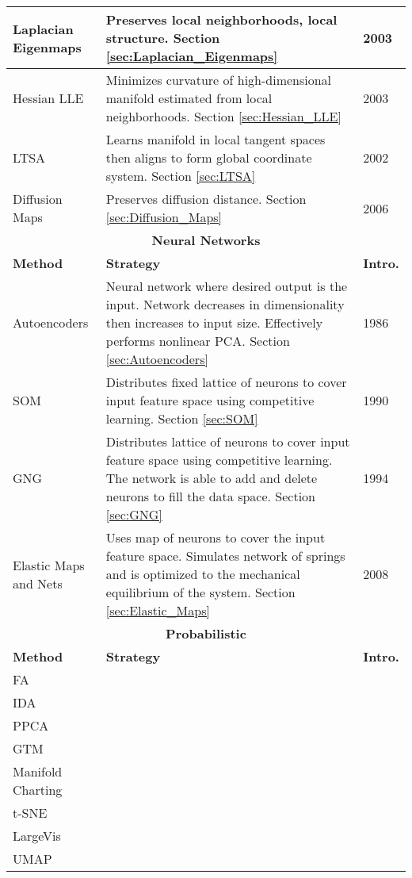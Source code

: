 \begin{longtable}{ |p{}|p{}|p{}| }
	\hline
	Laplacian Eigenmaps  & Preserves local neighborhoods, local structure.  Section \ref{sec:Laplacian_Eigenmaps}  & 2003 \\
	\hline
	Hessian LLE  & Minimizes curvature of high-dimensional manifold estimated from local neighborhoods. Section \ref{sec:Hessian_LLE} & 2003 \\
	\hline
	LTSA  &  Learns manifold in local tangent spaces then aligns to form global coordinate system.  Section \ref{sec:LTSA} & 2002\\
	\hline
	Diffusion Maps  & Preserves diffusion distance.  Section \ref{sec:Diffusion_Maps}  & 2006\\
	\hline
	\multicolumn{3}{|c|}{\textbf{Neural Networks}} \\
	\hline
	\textbf{Method} & \textbf{Strategy} & \textbf{Intro.}\\
	\hline
	Autoencoders  & Neural network where desired output is the input.  Network decreases in dimensionality then increases to input size.  Effectively performs nonlinear PCA. Section \ref{sec:Autoencoders}  & 1986 \\
	\hline
	SOM  & Distributes fixed lattice of neurons to cover input feature space using competitive learning. Section \ref{sec:SOM}   & 1990\\
	\hline
	GNG  & Distributes lattice of neurons to cover input feature space using competitive learning. The network is able to add and delete neurons to fill the data space. Section \ref{sec:GNG}& 1994\\
	\hline
	Elastic Maps and Nets  &  Uses map of neurons to cover the input feature space. Simulates network of springs and is optimized to the mechanical equilibrium of the system.  Section \ref{sec:Elastic_Maps}  & 2008 \\
	\hline
	\multicolumn{3}{|c|}{\textbf{Probabilistic}}\\
	\hline
	\textbf{Method} & \textbf{Strategy} & \textbf{Intro.}\\
	\hline
	FA  & ~   & ~\\
	\hline
	IDA  & ~  & ~\\
	\hline
	PPCA  & ~   & ~\\
	\hline
	GTM  & ~  & ~\\
	\hline
	Manifold Charting  & ~  & ~ \\
	\hline
	t-SNE  & ~  & ~ \\
	\hline
	LargeVis  & ~  & ~ \\
	\hline
	UMAP  & ~  & ~ \\
	\hline
\end{longtable}


